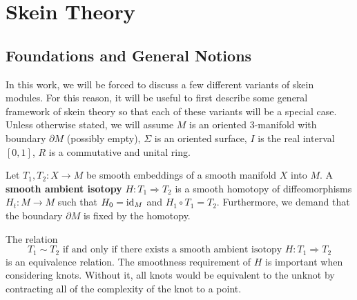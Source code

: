 \chapter{Skein Theory} \label{chapter2}

\section{Foundations and General Notions}
In this work, we will be forced to discuss a few different variants of skein modules. For this reason, it will be useful to first describe some general framework of skein theory so that each of these variants will be a special case. Unless otherwise stated, we will assume $M$ is an oriented $3$-manifold with boundary $\partial M$ (possibly empty), $\Sigma$ is an oriented surface, $I$ is the real interval $[0,1]$, $R$ is a commutative and unital ring. 

\begin{definition}
    Let $T_1, T_2: X \to M$ be smooth embeddings of a smooth manifold $X$ into $M$. A \textbf{smooth ambient isotopy} $H: T_1 \Rightarrow T_2$ is a smooth homotopy of diffeomorphisms $H_t: M \to M$ such that $H_0={\rm{id}}_M$ and $H_1 \circ T_1 = T_2$. Furthermore, we demand that the boundary $\partial M$ is fixed by the homotopy. 
\end{definition}

The relation 
\[
T_1 \sim T_2 \textrm{ if and only if there exists a smooth ambient isotopy } H: T_1 \Rightarrow T_2
\]
is an equivalence relation. The smoothness requirement of $H$ is important when considering knots. Without it, all knots would be equivalent to the unknot by contracting all of the complexity of the knot to a point. 

